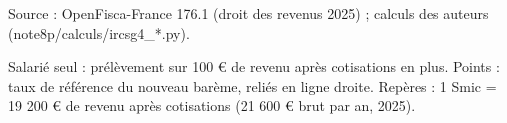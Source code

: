 Source : OpenFisca-France 176.1 (droit des revenus 2025) ; calculs des auteurs (note8p/calculs/ircsg4\_*.py).\par Salarié seul : prélèvement sur 100 € de revenu après cotisations en plus. Points : taux de référence du nouveau barème, reliés en ligne droite. Repères : 1 Smic = 19 200 € de revenu après cotisations (21 600 € brut par an, 2025).
